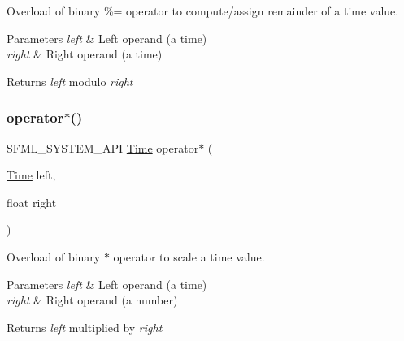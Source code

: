 Overload of binary \%= operator to compute/assign remainder of a time value. 


\begin{DoxyParams}{Parameters}
{\em left} & Left operand (a time) \\
\hline
{\em right} & Right operand (a time)\\
\hline
\end{DoxyParams}
\begin{DoxyReturn}{Returns}
{\itshape left} modulo {\itshape right} \begin{DoxyVerb}\end{DoxyVerb}
 
\end{DoxyReturn}
\mbox{\label{classsf_1_1_time_ac1386c6360872d354b9b59eadcd9778d}} 
\subsubsection{\texorpdfstring{operator$\ast$()}{operator*()}\hspace{0.1cm}{\footnotesize\ttfamily [1/4]}}
{\footnotesize\ttfamily S\+F\+M\+L\+\_\+\+S\+Y\+S\+T\+E\+M\+\_\+\+A\+PI \mbox{\hyperlink{classsf_1_1_time}{Time}} operator$\ast$ (\begin{DoxyParamCaption}\item[{\mbox{\hyperlink{classsf_1_1_time}{Time}}}]{left,  }\item[{float}]{right }\end{DoxyParamCaption})\hspace{0.3cm}{\ttfamily [related]}}



Overload of binary $\ast$ operator to scale a time value. 


\begin{DoxyParams}{Parameters}
{\em left} & Left operand (a time) \\
\hline
{\em right} & Right operand (a number)\\
\hline
\end{DoxyParams}
\begin{DoxyReturn}{Returns}
{\itshape left} multiplied by {\itshape right} \begin{DoxyVerb}\end{DoxyVerb}
 
\end{DoxyReturn}
\mbox{\label{classsf_1_1_time_acd021b3ebb108053d7dec56869e27385}} 
